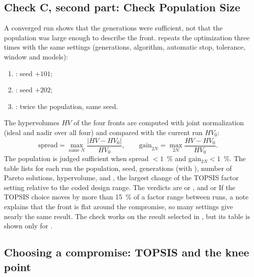 \subsection{Check C, second part: Check Population Size}
A converged run shows that the generations were sufficient, not that the population was large enough to describe the
front.  repeats the optimization three times with the same settings (generations,
algorithm, automatic stop, tolerance, window and models):
\begin{enumerate}
  \item {}: seed $+101$;
  \item {}: seed $+202$;
  \item {}: twice the population, same seed.
\end{enumerate}
The hypervolumes $HV$ of the four fronts are computed with joint normalization (ideal and nadir over all four) and
compared with the current run $HV_0$:
\begin{equation}
\text{spread}=\max_{\text{same }N}\frac{|HV-HV_0|}{HV_0},\qquad
\text{gain}_{2N}=\max_{2N}\frac{HV-HV_0}{HV_0}.
\label{eq:ch08-popcheck}
\end{equation}
The population is judged sufficient when spread $<1$~\% and gain$_{2N}<1$~\%. The table 
lists for each run the population, seed, generations (with ), number of Pareto solutions, hypervolume,
 and , the largest change of the TOPSIS factor setting
relative to the coded design range. The verdicts are 
or , and  or
 If the
TOPSIS choice moves by more than 15~\% of a factor range between runs, a note explains that the front is flat around
the compromise, so many settings give nearly the same result. The check works on the result selected in ,
but its table is shown only for .

\subsection{Choosing a compromise: TOPSIS and the knee point}
